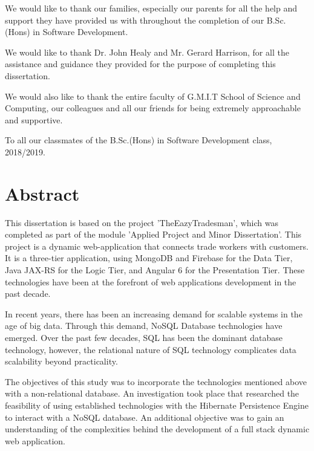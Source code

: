 \documentclass[12pt,a4paper,oneside,openany]{book}
\begin{document}
  \bigskip
  
We would like to thank our families, especially our parents for all the help and support they have provided us with throughout the completion of our B.Sc.(Hons) in Software Development. 

\bigskip

We would like to thank Dr. John Healy and Mr. Gerard Harrison, for all the assistance and guidance they provided for the purpose of completing this dissertation. 

\bigskip

We would also like to thank the entire faculty of G.M.I.T School of Science and Computing, our colleagues and all our friends for being extremely approachable and supportive.

\bigskip

To all our classmates of the B.Sc.(Hons) in Software Development class, 2018/2019.

  
  \chapter*{Abstract}
This dissertation is based on the project 'TheEazyTradesman', which was completed as part of the module 'Applied Project and Minor Dissertation'. This project is a dynamic web-application that connects trade workers with customers. It is a three-tier application, using MongoDB and Firebase for the Data Tier, Java JAX-RS for the Logic Tier, and Angular 6 for the Presentation Tier. These technologies have been at the forefront of web applications development in the past decade.

\bigskip

In recent years, there has been an increasing demand for scalable systems in the age of big data. Through this demand, NoSQL Database technologies have emerged. Over the past few decades, SQL has been the dominant database technology, however, the relational nature of SQL technology complicates data scalability beyond practicality.

\bigskip

The objectives of this study was to incorporate the technologies mentioned above with a non-relational database. An investigation took place that researched the feasibility of using established technologies with the Hibernate Persistence Engine to interact with a NoSQL database. An additional objective was to gain an understanding of the complexities behind the development of a full stack dynamic web application. 
\end{document}
